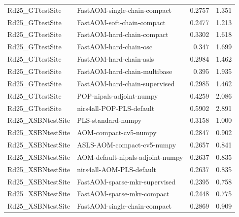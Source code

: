 \begin{landscape}
\begin{longtable}{L{8.0cm}L{9.5cm}rr}
Rd25\_\allowbreak{}GTtestSite & FastAOM-\allowbreak{}single-\allowbreak{}chain-\allowbreak{}compact & 0.2757 & 1.351 \\
Rd25\_\allowbreak{}GTtestSite & FastAOM-\allowbreak{}soft-\allowbreak{}chain-\allowbreak{}compact & 0.2477 & 1.213 \\
Rd25\_\allowbreak{}GTtestSite & FastAOM-\allowbreak{}hard-\allowbreak{}chain-\allowbreak{}compact & 0.3302 & 1.618 \\
Rd25\_\allowbreak{}GTtestSite & FastAOM-\allowbreak{}hard-\allowbreak{}chain-\allowbreak{}osc & 0.347 & 1.699 \\
Rd25\_\allowbreak{}GTtestSite & FastAOM-\allowbreak{}hard-\allowbreak{}chain-\allowbreak{}asls & 0.2984 & 1.462 \\
Rd25\_\allowbreak{}GTtestSite & FastAOM-\allowbreak{}hard-\allowbreak{}chain-\allowbreak{}multibase & 0.395 & 1.935 \\
Rd25\_\allowbreak{}GTtestSite & FastAOM-\allowbreak{}hard-\allowbreak{}chain-\allowbreak{}supervised & 0.2985 & 1.462 \\
Rd25\_\allowbreak{}GTtestSite & POP-\allowbreak{}nipals-\allowbreak{}adjoint-\allowbreak{}numpy & 0.4259 & 2.086 \\
Rd25\_\allowbreak{}GTtestSite & nirs4all-\allowbreak{}POP-\allowbreak{}PLS-\allowbreak{}default & 0.5902 & 2.891 \\
Rd25\_\allowbreak{}XSBNtestSite & PLS-\allowbreak{}standard-\allowbreak{}numpy & 0.3158 & 1.000 \\
Rd25\_\allowbreak{}XSBNtestSite & AOM-\allowbreak{}compact-\allowbreak{}cv5-\allowbreak{}numpy & 0.2847 & 0.902 \\
Rd25\_\allowbreak{}XSBNtestSite & ASLS-\allowbreak{}AOM-\allowbreak{}compact-\allowbreak{}cv5-\allowbreak{}numpy & 0.2657 & 0.841 \\
Rd25\_\allowbreak{}XSBNtestSite & AOM-\allowbreak{}default-\allowbreak{}nipals-\allowbreak{}adjoint-\allowbreak{}numpy & 0.2637 & 0.835 \\
Rd25\_\allowbreak{}XSBNtestSite & nirs4all-\allowbreak{}AOM-\allowbreak{}PLS-\allowbreak{}default & 0.2637 & 0.835 \\
Rd25\_\allowbreak{}XSBNtestSite & FastAOM-\allowbreak{}sparse-\allowbreak{}mkr-\allowbreak{}supervised & 0.2395 & 0.758 \\
Rd25\_\allowbreak{}XSBNtestSite & FastAOM-\allowbreak{}sparse-\allowbreak{}mkr-\allowbreak{}compact & 0.2448 & 0.775 \\
Rd25\_\allowbreak{}XSBNtestSite & FastAOM-\allowbreak{}single-\allowbreak{}chain-\allowbreak{}compact & 0.2869 & 0.909 \\

\end{longtable}
\end{landscape}
